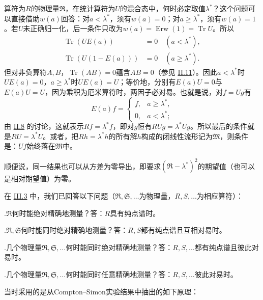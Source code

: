 \documentclass[fontsize=13pt,twoside,openany,headings=normal,parskip=false,bookmarkpackage=false,DIV=calc]{scrbook}
\begin{document}
算符为$R$的物理量$\mathfrak R$，在统计算符为$U$的混合态中，何时必定取值$\lambda^*$？这个问题可以直接借助$w(a)$回答：对$a<\lambda^*$，须有$w(a)=0$；对$a\geq\lambda^*$，须有$w(a)=1$。若$U$未正确归一化，后一条件只改为$w(a)=\operatorname{Erw}(1)=\operatorname{Tr}U$。所以
\begin{align*}
\operatorname{Tr}(UE(a))&=0\quad(a<\lambda^*),\\
\operatorname{Tr}(U(1-E(a)))&=0\quad(a\geq\lambda^*).
\end{align*}
但对非负算符$A,\allowbreak B$，$\operatorname{Tr}(AB)=0$蕴含$AB=0$（参见 \hyperref[sec:II.11]{II.11}）。因此$a<\lambda^*$时$UE(a)=0$，$a\geq\lambda^*$时$UE(a)=U$；等价地，分别有$E(a)U=0$与$E(a)U=U$，因为乘积为厄米算符时，两因子必对易。也就是说，对$f=Ug$有
\[
E(a)f=\begin{cases}f,&a\geq\lambda^*,\\0,&a<\lambda^*;\end{cases}
\]
由 \hyperref[sec:II.8]{II.8} 的讨论，\hypertarget{origpage-177}{}\label{origpage-177}这就表示$Rf=\lambda^*f$，即对$g$恒有$RUg=\lambda^*Ug$。所以最后的条件就是$RU=\lambda^*U$。或者，把$Rh=\lambda^*h$的所有解$h$构成的闭线性流形记为$\mathfrak M$，则条件是：$Uf$始终落在$\mathfrak M$中。

顺便说，同一结果也可以从方差为零导出，即要求$(\mathfrak R-\lambda^*)^2$的期望值（也可以是相对期望值）为零。

在 \hyperref[sec:III.3]{III.3} 中，我们已回答以下问题（$\mathfrak R,\allowbreak \mathfrak S,\allowbreak \ldots$为物理量，$R,\allowbreak S,\allowbreak \ldots$为相应算符）：

\noindent{}.\label{criterion:IV.3.1}$\mathfrak R$何时能绝对精确地测量？答：$R$具有纯点谱时。

\noindent{}.\label{criterion:IV.3.2}$\mathfrak R,\allowbreak \mathfrak S$何时能同时绝对精确地测量？答：$R,\allowbreak S$都有纯点谱且互相对易时。

\noindent{}.\label{criterion:IV.3.3}几个物理量$\mathfrak R,\allowbreak \mathfrak S,\allowbreak \ldots$何时能同时绝对精确地测量？答：$R,\allowbreak S,\allowbreak \ldots$都有纯点谱且彼此对易时。

\noindent{}.\label{criterion:IV.3.4}几个物理量$\mathfrak R,\allowbreak \mathfrak S,\allowbreak \ldots$何时能同时任意精确地测量？答：$R,\allowbreak S,\allowbreak \ldots$彼此对易时。

当时采用的是从Compton--Simon实验结果中抽出的如下原理：
\end{document}
